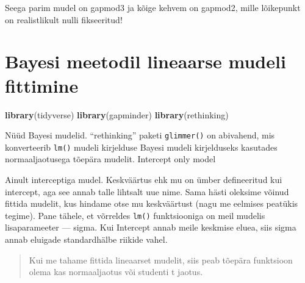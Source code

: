 \documentclass[]{book}
\newenvironment{Shaded}{\begin{snugshade}}{\end{snugshade}}
\newcommand{\KeywordTok}[1]{\textcolor[rgb]{0.13,0.29,0.53}{\textbf{#1}}}
\newcommand{\DataTypeTok}[1]{\textcolor[rgb]{0.13,0.29,0.53}{#1}}
\newcommand{\DecValTok}[1]{\textcolor[rgb]{0.00,0.00,0.81}{#1}}
\newcommand{\StringTok}[1]{\textcolor[rgb]{0.31,0.60,0.02}{#1}}
\newcommand{\CommentTok}[1]{\textcolor[rgb]{0.56,0.35,0.01}{\textit{#1}}}
\newcommand{\OperatorTok}[1]{\textcolor[rgb]{0.81,0.36,0.00}{\textbf{#1}}}
\newcommand{\NormalTok}[1]{#1}
\begin{document}
Seega parim mudel on gapmod3 ja kõige kehvem on gapmod2, mille
lõikepunkt on realistlikult nulli fikseeritud!

\chapter{Bayesi meetodil lineaarse mudeli
fittimine}\label{bayesi-meetodil-lineaarse-mudeli-fittimine}

\begin{Shaded}
\begin{Highlighting}[]
\KeywordTok{library}\NormalTok{(tidyverse)}
\KeywordTok{library}\NormalTok{(gapminder)}
\KeywordTok{library}\NormalTok{(rethinking)}
\end{Highlighting}
\end{Shaded}

Nüüd Bayesi mudelid. ``rethinking'' paketi \texttt{glimmer()} on
abivahend, mis konverteerib \texttt{lm()} mudeli kirjelduse Bayesi
mudeli kirjelduseks kasutades normaaljaotusega tõepära mudelit.
Intercept only model

\begin{Shaded}
\end{Shaded}

Ainult interceptiga mudel. Keskväärtus ehk mu on ümber defineeritud kui
intercept, aga see annab talle lihtsalt uue nime. Sama hästi oleksime
võinud fittida mudelit, kus hindame otse mu keskväärtust (nagu me
eelmises peatükis tegime). Pane tähele, et võrreldes \texttt{lm()}
funktsiooniga on meil mudelis lisaparameeter --- sigma. Kui Intercept
annab meile keskmise eluea, siis sigma annab eluigade standardhälbe
riikide vahel.

\begin{quote}
Kui me tahame fittida lineaarset mudelit, siis peab tõepära funktsioon
olema kas normaaljaotus või studenti t jaotus.
\end{quote}
\end{document}
